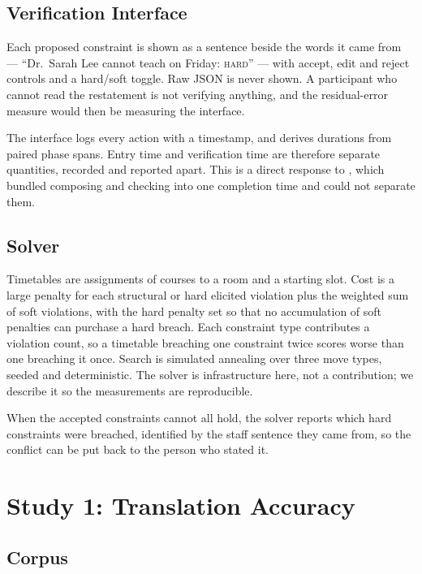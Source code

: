 \documentclass[acmsmall,screen,review,anonymous]{acmart}
\begin{document}
\subsection{Verification Interface}

Each proposed constraint is shown as a sentence beside the words it came from
--- ``Dr.\ Sarah Lee cannot teach on Friday: \textsc{hard}'' --- with accept,
edit and reject controls and a hard/soft toggle. Raw JSON is never shown. A
participant who cannot read the restatement is not verifying anything, and the
residual-error measure would then be measuring the interface.

The interface logs every action with a timestamp, and derives durations from
paired phase spans. Entry time and verification time are therefore separate
quantities, recorded and reported apart. This is a direct response to
\cite{ipeirotis2026nlidb}, which bundled composing and checking into one
completion time and could not separate them.

\subsection{Solver}

Timetables are assignments of courses to a room and a starting slot. Cost is a
large penalty for each structural or hard elicited violation plus the weighted
sum of soft violations, with the hard penalty set so that no accumulation of
soft penalties can purchase a hard breach. Each constraint type contributes a
violation count, so a timetable breaching one constraint twice scores worse
than one breaching it once. Search is simulated annealing over three move
types, seeded and deterministic. The solver is infrastructure here, not a
contribution; we describe it so the measurements are reproducible.

When the accepted constraints cannot all hold, the solver reports which hard
constraints were breached, identified by the staff sentence they came from, so
the conflict can be put back to the person who stated it.

\section{Study 1: Translation Accuracy}
\label{sec:study1}

\subsection{Corpus}
\end{document}

